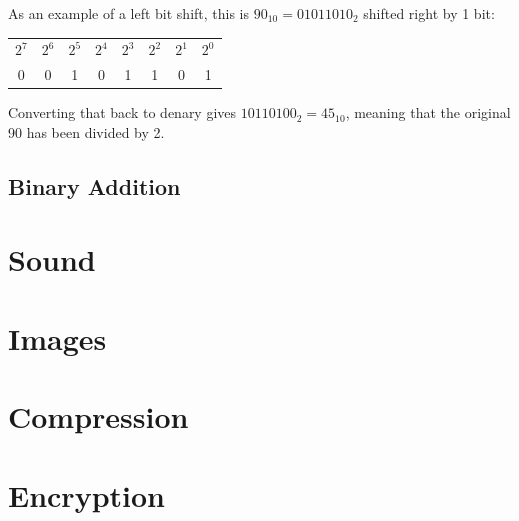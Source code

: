             As an example of a left bit shift, this is $90_{10}=01011010_2$ shifted right by 1 bit:
            \begin{center}
            \begin{tabular}{c c c c c c c c}
                $2^7$&$2^6$&$2^5$&$2^4$&$2^3$&$2^2$&$2^1$&$2^0$ \\
                  0  &  0  &  1  &  0  &  1  &  1  &  0  &  1
            \end{tabular}
            \end{center}
            Converting that back to denary gives $10110100_2=45_{10}$, meaning that the original 90 has been divided by 2.

    \subsection{Binary Addition}

    \newpage

\section{Sound} \label{sound}
    \newpage

\section{Images} \label{images}
    \newpage
    
\section{Compression} \label{compression}
    \newpage
    
\section{Encryption} \label{encryption}
    \newpage